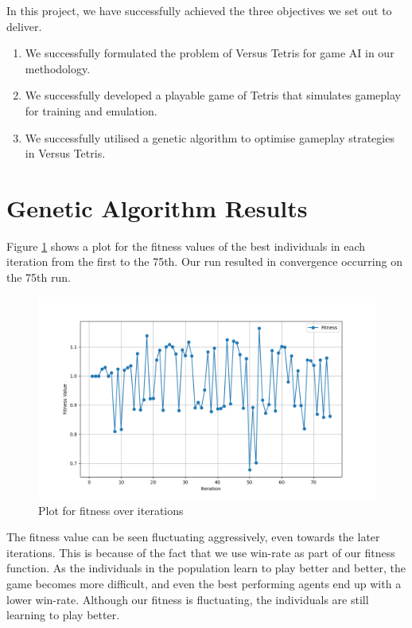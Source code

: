 \documentclass[a4paper, 12pt]{extreport}
\begin{document}
			In this project, we have successfully achieved the three objectives we set out to deliver.
			
			\begin{enumerate}
				\item We successfully formulated the problem of Versus Tetris for game AI in our methodology.
				\item We successfully developed a playable game of Tetris that simulates gameplay for training and emulation.
				\item We successfully utilised a genetic algorithm to optimise gameplay strategies in Versus Tetris.
			\end{enumerate}
			
		\section{Genetic Algorithm Results}
		
			Figure \ref{fig:fit-over-iter} shows a plot for the fitness values of the best individuals in each iteration from the first to the 75th. Our run resulted in convergence occurring on the 75th run.
		
			\begin{figure}
				\centering
				\includegraphics[width=\textwidth]{plots/fitness over iterations.png}
				\caption{Plot for fitness over iterations}
				\label{fig:fit-over-iter}
			\end{figure}
			
			The fitness value can be seen fluctuating aggressively, even towards the later iterations. This is because of the fact that we use win-rate as part of our fitness function. As the individuals in the population learn to play better and better, the game becomes more difficult, and even the best performing agents end up with a lower win-rate. Although our fitness is fluctuating, the individuals are still learning to play better. 
			
\end{document}
